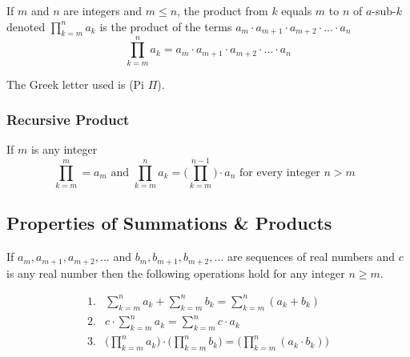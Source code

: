 \documentclass[11pt]{article}
\begin{document}
\begin{definition}[Product]\label{def:product}
    If $m$ and $n$ are integers and $m \leq n$,
    the product from $k$ equals $m$ to $n$ of $a$-sub-$k$ denoted
    $\prod_{k=m}^n a_k$
    is the product of the terms $a_m \cdot a_{m+1} \cdot a_{m+2} \cdot ... \cdot a_n$
    \begin{equation*}
        \prod_{k=m}^n a_k = a_m \cdot a_{m+1} \cdot a_{m+2} \cdot ... \cdot a_n
    \end{equation*}

    The Greek letter used is (Pi $\Pi$).
\end{definition}

\subsubsection{Recursive Product}

\begin{definition}\label{def:recursive-product}
    If $m$ is any integer
    \begin{equation*}
        \prod_{k=m}^m = a_m \text{ and } \prod_{k=m}^n a_k = \Biggl( \prod_{k=m}^{n-1} \Biggl) \cdot a_n \text { for every integer $n > m$ }
    \end{equation*}
\end{definition}

\subsection{Properties of Summations \& Products}

\begin{definition}\label{def:props-sums-prods}
    If $a_m, a_{m+1}, a_{m+2}, ...$ and $b_m, b_{m+1}, b_{m+2}, ...$
    are sequences of real numbers and $c$ is any real number then
    the following operations hold for any integer $n \geq m$.

    \begin{align*}
        \text{1.} & \sum_{k=m}^n a_k + \sum_{k=m}^n b_k = \sum_{k=m}^n (a_k + b_k) \\
        \text{2.} & c \cdot \sum_{k=m}^n a_k = \sum_{k=m}^n c \cdot a_k \\
        \text{3.} & \Biggl( \prod_{k=m}^n a_k \Biggl) \cdot \Biggl( \prod_{k=m}^n b_k \Biggl) =
                    \Biggl( \prod_{k=m}^n (a_k \cdot b_k) \Biggl) \\
    \end{align*}

\end{definition}
\end{document}
